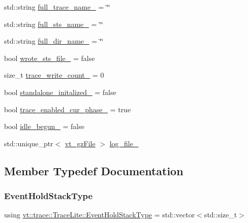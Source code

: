 \begin{DoxyCompactItemize}
\item 
std\+::string \hyperlink{structvt_1_1trace_1_1_trace_lite_a0381e516d389555b3b40b954d276eff9}{full\+\_\+trace\+\_\+name\+\_\+} = \char`\"{}\char`\"{}
\item 
std\+::string \hyperlink{structvt_1_1trace_1_1_trace_lite_aa7236609212e978252ddefd9c0131537}{full\+\_\+sts\+\_\+name\+\_\+} = \char`\"{}\char`\"{}
\item 
std\+::string \hyperlink{structvt_1_1trace_1_1_trace_lite_a3871cf535ca6f31bfb499a46cde4c80c}{full\+\_\+dir\+\_\+name\+\_\+} = \char`\"{}\char`\"{}
\item 
bool \hyperlink{structvt_1_1trace_1_1_trace_lite_a3af89ea00d5dfcf4341aabf9c2b33aef}{wrote\+\_\+sts\+\_\+file\+\_\+} = false
\item 
size\+\_\+t \hyperlink{structvt_1_1trace_1_1_trace_lite_ac4f99b5bd44df7b4aa07b700fab162c7}{trace\+\_\+write\+\_\+count\+\_\+} = 0
\item 
bool \hyperlink{structvt_1_1trace_1_1_trace_lite_a1c41f9e975ef1ba41cc6550bab7b2375}{standalone\+\_\+initalized\+\_\+} = false
\item 
bool \hyperlink{structvt_1_1trace_1_1_trace_lite_ae75d01f083974fe39f81455377ac3842}{trace\+\_\+enabled\+\_\+cur\+\_\+phase\+\_\+} = true
\item 
bool \hyperlink{structvt_1_1trace_1_1_trace_lite_a75ffdb0ab1dea68a665085596ece7b96}{idle\+\_\+begun\+\_\+} = false
\item 
std\+::unique\+\_\+ptr$<$ \hyperlink{structvt_1_1trace_1_1vt__gz_file}{vt\+\_\+gz\+File} $>$ \hyperlink{structvt_1_1trace_1_1_trace_lite_ab074b4892ac4fd0508c03150710eb46d}{log\+\_\+file\+\_\+}
\end{DoxyCompactItemize}


\subsection{Member Typedef Documentation}
\mbox{\label{structvt_1_1trace_1_1_trace_lite_af9e05e83b3d0adfb9d45cf13c0bb7525}} 
\subsubsection{\texorpdfstring{Event\+Hold\+Stack\+Type}{EventHoldStackType}}
{\footnotesize\ttfamily using \hyperlink{structvt_1_1trace_1_1_trace_lite_af9e05e83b3d0adfb9d45cf13c0bb7525}{vt\+::trace\+::\+Trace\+Lite\+::\+Event\+Hold\+Stack\+Type} =  std\+::vector$<$std\+::size\+\_\+t$>$}

